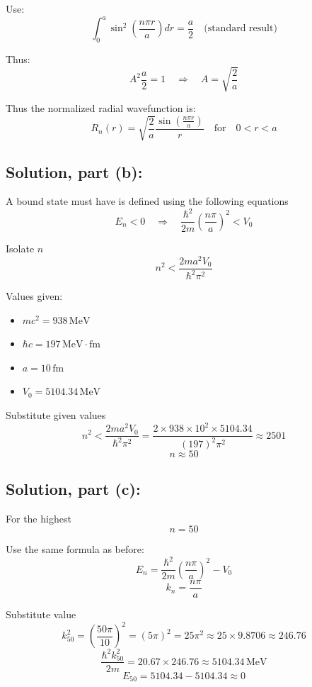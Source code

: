 \documentclass[12pt]{article}
\begin{document}
        Use:
        \[
            \int_0^a \sin^2\left( \frac{n\pi r}{a} \right) dr = \frac{a}{2} \quad \text{(standard result)}
        \]

        Thus:
        \[
            A^2 \frac{a}{2} = 1 \quad \Rightarrow \quad A = \sqrt{\frac{2}{a}}
        \]

        Thus the normalized radial wavefunction is:
        \[
            \boxed{R_n(r) = \sqrt{\frac{2}{a}} \frac{\sin\left( \frac{n\pi r}{a} \right)}{r}}
            \quad \text{for} \quad 0 < r < a
        \]

    \subsection{Solution, part (b):}
        A bound state must have is defined using the following equations
        \[
            E_n < 0 \quad \Rightarrow \quad \frac{\hbar^2}{2m} \left( \frac{n\pi}{a} \right)^2 < V_0
        \]

        Isolate \( n \)
        \[
        n^2 < \frac{2m a^2 V_0}{\hbar^2 \pi^2}
        \]

        Values given:
        \begin{itemize}
            \item \( m c^2 = 938 \, \text{MeV} \)
            \item \( \hbar c = 197 \, \text{MeV} \cdot \text{fm} \)
            \item \( a = 10 \, \text{fm} \)
            \item \( V_0 = 5104.34 \, \text{MeV} \)
        \end{itemize}

        Substitute given values
        \[
            n^2 < \frac{2m a^2 V_0}{\hbar^2 \pi^2} = \frac{2 \times 938 \times 10^2 \times 5104.34}{(197)^2 \pi^2} \approx 2501
        \]
        \[
            n \approx 50
        \]

    \subsection{Solution, part (c):}
        For the highest
        \[
            n = 50
        \]

        Use the same formula as before:
        \[
        E_n = \frac{\hbar^2}{2m} \left( \frac{n\pi}{a} \right)^2 - V_0
        \]
        \[
            k_{n} = \frac{n \pi}{a}
        \]

        Substitute value
        \[
            k_{50}^2 = \left( \frac{50\pi}{10} \right)^2 = (5\pi)^2 = 25\pi^2 \approx 25 \times 9.8706 \approx 246.76
        \]
        \[
            \frac{\hbar^2 k_{50}^2}{2m} = 20.67 \times 246.76 \approx 5104.34 \, \text{MeV}
        \]
        \[
            E_{50} = 5104.34 - 5104.34 \approx 0
        \]
\end{document}
